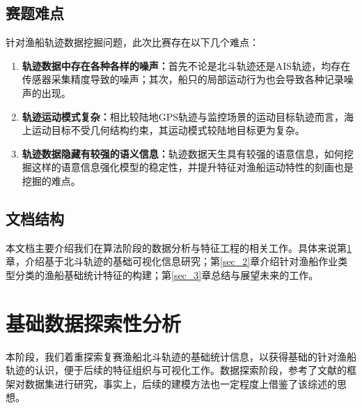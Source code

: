 \documentclass[UTF8, 12pt]{ctexart}
\begin{document}
		\subsection{赛题难点}
		针对渔船轨迹数据挖掘问题，此次比赛存在以下几个难点：
		\begin{enumerate}
			\item \textbf{轨迹数据中存在各种各样的噪声：}首先不论是北斗轨迹还是AIS轨迹，均存在传感器采集精度导致的噪声；其次，船只的局部运动行为也会导致各种记录噪声的出现。
			\item \textbf{轨迹运动模式复杂：}相比较陆地GPS轨迹与监控场景的运动目标轨迹而言，海上运动目标不受几何结构约束，其运动模式较陆地目标更为复杂。
			\item \textbf{轨迹数据隐藏有较强的语义信息：}轨迹数据天生具有较强的语意信息，如何挖掘这样的语意信息强化模型的稳定性，并提升特征对渔船运动特性的刻画也是挖掘的难点。
		\end{enumerate}

		\subsection{文档结构}
		本文档主要介绍我们在算法阶段的数据分析与特征工程的相关工作。具体来说第\ref{sec_1}章，介绍基于北斗轨迹的基础可视化信息研究；第\ref{sec_2}章介绍针对渔船作业类型分类的渔船基础统计特征的构建；第\ref{sec_3}章总结与展望未来的工作。

	\section{基础数据探索性分析}\label{sec_1}
	本阶段，我们着重探索复赛渔船北斗轨迹的基础统计信息，以获得基础的针对渔船轨迹的认识，便于后续的特征组织与可视化工作。数据探索阶段，参考了文献\cite{Yu2015Trajectory}的框架对数据集进行研究，事实上，后续的建模方法也一定程度上借鉴了该综述的思想。

\end{document}
